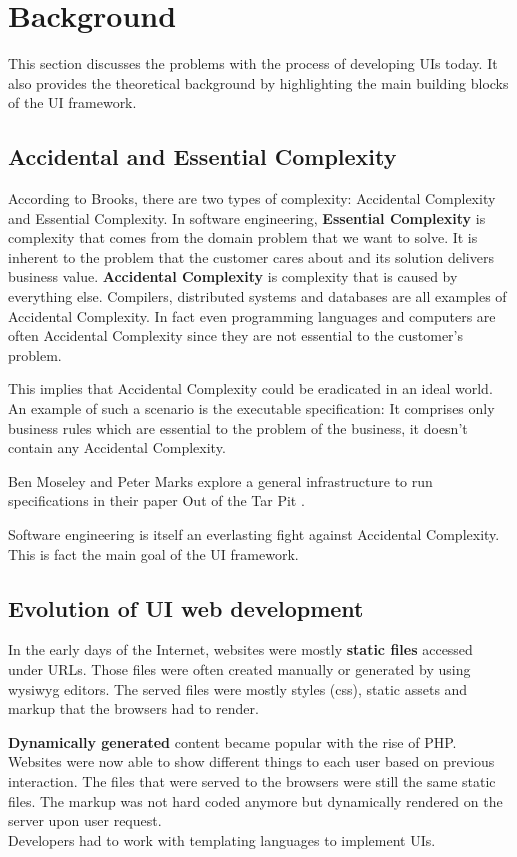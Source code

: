\section{Background}\label{background}

This section discusses the problems with the process of developing UIs today. It also provides the theoretical background by highlighting the main building blocks of the UI framework.

\subsection{Accidental and Essential Complexity}
According to Brooks, there are two types of complexity: Accidental Complexity and Essential Complexity. \citep{nosilverbullet}
In software engineering, \textbf{Essential Complexity} is complexity that comes from the domain problem that we want to solve. It is inherent to the problem that the customer cares about and its solution delivers business value. \textbf{Accidental Complexity} is complexity that is caused by everything else. Compilers, distributed systems and databases are all examples of Accidental Complexity. In fact even programming languages and computers are often Accidental Complexity since they are not essential to the customer's problem.

This implies that Accidental Complexity could be eradicated in an ideal world. An example of such a scenario is the executable specification: It comprises only business rules which are essential to the problem of the business, it doesn't contain any Accidental Complexity.

Ben Moseley and Peter Marks explore a general infrastructure to run specifications in their paper Out of the Tar Pit \citep{outoftarpit}.

Software engineering is itself an everlasting fight against Accidental Complexity. This is fact the main goal of the UI framework.

\subsection{Evolution of UI web development}\label{history}
In the early days of the Internet, websites were mostly \textbf{static files} accessed under URLs. Those files were often created manually or generated by using \gls{wysiwyg} editors. The served files were mostly styles (\gls{css}), static assets and markup that the browsers had to render.

\textbf{Dynamically generated} content became popular with the rise of PHP. Websites were now able to show different things to each user based on previous interaction. The files that were served to the browsers were still the same static files. The markup was not hard coded anymore but dynamically rendered on the server upon user request.
\\ Developers had to work with templating languages to implement UIs.

